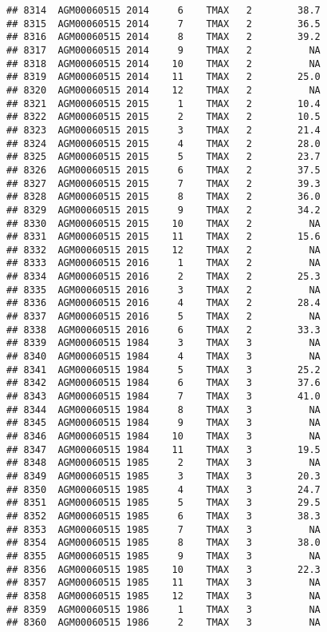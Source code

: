 \documentclass{article}\usepackage[]{graphicx}\usepackage[]{color}
\makeatletter
\newenvironment{kframe}{%
 \def\at@end@of@kframe{}%
 \ifinner\ifhmode%
  \def\at@end@of@kframe{\end{minipage}}%
  \begin{minipage}{\columnwidth}%
 \fi\fi%
 \def\FrameCommand##1{\hskip\@totalleftmargin \hskip-\fboxsep
 \colorbox{shadecolor}{##1}\hskip-\fboxsep
     \hskip-\linewidth \hskip-\@totalleftmargin \hskip\columnwidth}%
 \MakeFramed {\advance\hsize-\width
   \@totalleftmargin\z@ \linewidth\hsize
   \@setminipage}}%
 {\par\unskip\endMakeFramed%
 \at@end@of@kframe}
\newenvironment{knitrout}{}{} %
\makeatother
\begin{document}
\begin{knitrout}
\begin{kframe}
\begin{verbatim}
## 8314  AGM00060515 2014     6    TMAX   2        38.7
## 8315  AGM00060515 2014     7    TMAX   2        36.5
## 8316  AGM00060515 2014     8    TMAX   2        39.2
## 8317  AGM00060515 2014     9    TMAX   2          NA
## 8318  AGM00060515 2014    10    TMAX   2          NA
## 8319  AGM00060515 2014    11    TMAX   2        25.0
## 8320  AGM00060515 2014    12    TMAX   2          NA
## 8321  AGM00060515 2015     1    TMAX   2        10.4
## 8322  AGM00060515 2015     2    TMAX   2        10.5
## 8323  AGM00060515 2015     3    TMAX   2        21.4
## 8324  AGM00060515 2015     4    TMAX   2        28.0
## 8325  AGM00060515 2015     5    TMAX   2        23.7
## 8326  AGM00060515 2015     6    TMAX   2        37.5
## 8327  AGM00060515 2015     7    TMAX   2        39.3
## 8328  AGM00060515 2015     8    TMAX   2        36.0
## 8329  AGM00060515 2015     9    TMAX   2        34.2
## 8330  AGM00060515 2015    10    TMAX   2          NA
## 8331  AGM00060515 2015    11    TMAX   2        15.6
## 8332  AGM00060515 2015    12    TMAX   2          NA
## 8333  AGM00060515 2016     1    TMAX   2          NA
## 8334  AGM00060515 2016     2    TMAX   2        25.3
## 8335  AGM00060515 2016     3    TMAX   2          NA
## 8336  AGM00060515 2016     4    TMAX   2        28.4
## 8337  AGM00060515 2016     5    TMAX   2          NA
## 8338  AGM00060515 2016     6    TMAX   2        33.3
## 8339  AGM00060515 1984     3    TMAX   3          NA
## 8340  AGM00060515 1984     4    TMAX   3          NA
## 8341  AGM00060515 1984     5    TMAX   3        25.2
## 8342  AGM00060515 1984     6    TMAX   3        37.6
## 8343  AGM00060515 1984     7    TMAX   3        41.0
## 8344  AGM00060515 1984     8    TMAX   3          NA
## 8345  AGM00060515 1984     9    TMAX   3          NA
## 8346  AGM00060515 1984    10    TMAX   3          NA
## 8347  AGM00060515 1984    11    TMAX   3        19.5
## 8348  AGM00060515 1985     2    TMAX   3          NA
## 8349  AGM00060515 1985     3    TMAX   3        20.3
## 8350  AGM00060515 1985     4    TMAX   3        24.7
## 8351  AGM00060515 1985     5    TMAX   3        29.5
## 8352  AGM00060515 1985     6    TMAX   3        38.3
## 8353  AGM00060515 1985     7    TMAX   3          NA
## 8354  AGM00060515 1985     8    TMAX   3        38.0
## 8355  AGM00060515 1985     9    TMAX   3          NA
## 8356  AGM00060515 1985    10    TMAX   3        22.3
## 8357  AGM00060515 1985    11    TMAX   3          NA
## 8358  AGM00060515 1985    12    TMAX   3          NA
## 8359  AGM00060515 1986     1    TMAX   3          NA
## 8360  AGM00060515 1986     2    TMAX   3          NA

\end{verbatim}
\end{kframe}
\end{knitrout}
\end{document}
